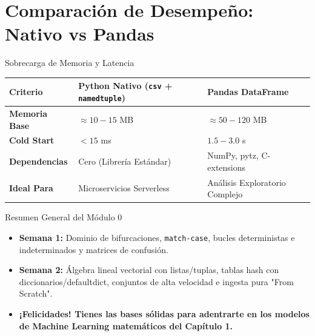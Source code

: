 \documentclass[aspectratio=169]{beamer}
\begin{document}
\section{Comparación de Desempeño: Nativo vs Pandas}

\begin{frame}{Sobrecarga de Memoria y Latencia}
    \begin{center}
    \begin{tabular}{lll}
        \toprule
        \textbf{Criterio} & \textbf{Python Nativo (\texttt{csv} + \texttt{namedtuple})} & \textbf{Pandas DataFrame} \\
        \midrule
        \textbf{Memoria Base} & $\approx 10 - 15$ MB & $\approx 50 - 120$ MB \\
        \textbf{Cold Start} & $< 15$ ms & $1.5 - 3.0$ s \\
        \textbf{Dependencias} & Cero (Librería Estándar) & NumPy, pytz, C-extensions \\
        \textbf{Ideal Para} & Microservicios Serverless & Análisis Exploratorio Complejo \\
        \bottomrule
    \end{tabular}
    \end{center}
\end{frame}

\begin{frame}{Resumen General del Módulo 0}
    \begin{itemize}
        \item \textbf{Semana 1:} Dominio de bifurcaciones, \texttt{match-case}, bucles deterministas e indeterminados y matrices de confusión.
        \item \textbf{Semana 2:} Álgebra lineal vectorial con listas/tuplas, tablas hash con diccionarios/defaultdict, conjuntos de alta velocidad e ingesta pura "From Scratch".
        \item \textbf{¡Felicidades! Tienes las bases sólidas para adentrarte en los modelos de Machine Learning matemáticos del Capítulo 1.}
    \end{itemize}
\end{frame}
\end{document}
